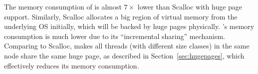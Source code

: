 The memory consumption of \NM{} is almost $7\times$ lower than Scalloc with huge page support. Similarly, Scalloc allocates a big region of virtual memory from the underlying OS initially, which will be backed by huge pages physically. \NM{}'s memory consumption is much lower due to its ``incremental sharing'' mechanism. Comparing to Scalloc, \NM{} makes all threads (with different size classes) in the same node share the same huge page, as described in Section~\ref{sec:hugepages}, which effectively reduces its memory consumption. 


 
 
